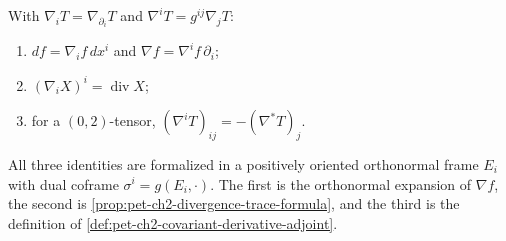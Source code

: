 \begin{remark}
  \label{rem:pet-ch2-ex-34}


  With
  $\nabla_iT=\nabla_{\partial_i}T$ and
  $\nabla^iT=g^{ij}\nabla_jT$:
  \begin{enumerate}
    \item $df=\nabla_if\,dx^i$ and
      $\nabla f=\nabla^if\,\partial_i$;
    \item $(\nabla_iX)^i=\operatorname{div}X$;
    \item for a $(0,2)$-tensor,
      $(\nabla^iT)_{ij}=-(\nabla^*T)_j$.
  \end{enumerate}
  All three identities are formalized in a positively oriented orthonormal
  frame $E_i$ with dual coframe $\sigma^i=g(E_i,\cdot)$.
  \sketch
  The first is the
  orthonormal expansion of $\nabla f$, the second is
  \cref{prop:pet-ch2-divergence-trace-formula}, and the third is the definition
  of \cref{def:pet-ch2-covariant-derivative-adjoint}.
\end{remark}
